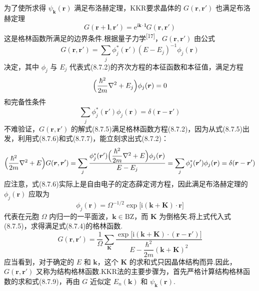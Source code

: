 为了使所求得 $\psi_{\boldsymbol{k}}(\boldsymbol{r})$ 满足布洛赫定理，KKR要求晶体的 $G(\boldsymbol{r},\boldsymbol{r}')$ 也满足布洛赫定理
\begin{equation}
  G(\boldsymbol{r}+\boldsymbol{l},\boldsymbol{r}')=\mathrm{e}^{\mathrm{i}\boldsymbol{k}\cdot\boldsymbol{l}}G(\boldsymbol{r},\boldsymbol{r}')
\end{equation}
这是格林函数所满足的边界条件.根据量子力学\textsuperscript{[17]}，$G(\boldsymbol{r},\boldsymbol{r}')$ 由公式
\begin{equation}
  G(\boldsymbol{r},\boldsymbol{r}')=\sum_{j}\phi_{j}^{*}(\boldsymbol{r}')(E-E_{j})^{-1}\phi_{j}(\boldsymbol{r})
\end{equation}
决定，其中 $\phi_{j}$ 与 $E_{j}$ 代表式(8.7.2)的齐次方程的本征函数和本征值，满足方程
\begin{equation}
  \Bigl(\frac{\hbar^{2}}{2m}\nabla^{2}+E_{j}\Bigr)\phi_{j}(\boldsymbol{r})=0
\end{equation}
和完备性条件
\begin{equation}
  \sum_{j}\phi_{j}^{*}(\boldsymbol{r}')\phi_{j}(\boldsymbol{r})=\delta(\boldsymbol{r}-\boldsymbol{r}')
\end{equation}
不难验证，$G(\boldsymbol{r},\boldsymbol{r}')$ 的解式(8.7.5)满足格林函数方程(8.7.2)，因为从式(8.7.5)出发，利用式(8.7.6)和式(8.7.7)，能立刻求出式(8.7.2)：
\begin{equation*}
  \Bigl(\frac{\hbar^{2}}{2m}\nabla^{2}+E\Bigr)G(\boldsymbol{r},\boldsymbol{r}')
  =\sum_{j}\frac{\phi_{j}^{*}(\boldsymbol{r}')\Bigl(\dfrac{\hbar^{2}}{2m}\nabla^{2}+E\Bigr)\phi_{j}(\boldsymbol{r})}{E-E_{j}}
  =\sum_{j}\phi_{j}^{*}(\boldsymbol{r}')\phi_{j}(\boldsymbol{r})=\delta(\boldsymbol{r}-\boldsymbol{r}')
\end{equation*}
应注意，式(8.7.6)实际上是自由电子的定态薛定谔方程，因此满足布洛赫定理的 $\phi_{j}(\boldsymbol{r})$ 应取为
\begin{equation}
  \phi_{j}(\boldsymbol{r})=\Omega^{-1/2}\exp\bigl[\mathrm{i}(\boldsymbol{k}+\boldsymbol{K})\cdot\boldsymbol{r}\bigr]
\end{equation}
代表在元胞 $\Omega$ 内归一的一平面波，$\boldsymbol{k}\in\mathrm{BZ}$，而 $\boldsymbol{K}$ 为倒格矢.将上式代入式(8.7.5)，求得满足式(8.7.4)的格林函数.
\begin{equation}
  G(\boldsymbol{r},\boldsymbol{r}')=\frac{1}{\Omega}\sum_{\boldsymbol{K}}
  \frac{\exp\bigl[\mathrm{i}(\boldsymbol{k}+\boldsymbol{K})\cdot(\boldsymbol{r}-\boldsymbol{r}')\bigr]}
  {E-\dfrac{\hbar^{2}}{2m}(\boldsymbol{k}+\boldsymbol{K})^{2}}
\end{equation}
应当看到，对于确定的 $E$ 和 $\boldsymbol{k}$，这个 $\boldsymbol{K}$ 的求和式只因晶体结构而异.因此，$G(\boldsymbol{r},\boldsymbol{r}')$ 又称为结构格林函数.KKR法的主要步骤为，首先严格计算结构格林函数的求和式(8.7.9)，再由 $G$ 近似定 $E_{n}(\boldsymbol{k})$ 和 $\psi_{\boldsymbol{k}}(\boldsymbol{r})$.

